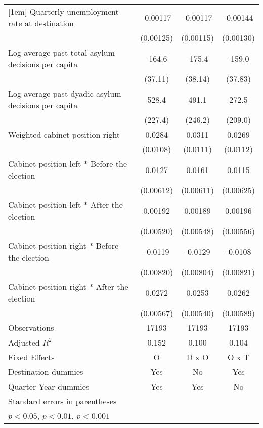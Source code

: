 \begin{table}[htbp]
\begin{tabular}{l*{3}{c}}
[1em]
Quarterly unemployment rate at destination&    -0.00117         &    -0.00117         &    -0.00144         \\
                    &   (0.00125)         &   (0.00115)         &   (0.00130)         \\
[1em]
Log average past total asylum decisions per capita&      -164.6\sym{***}&      -175.4\sym{***}&      -159.0\sym{***}\\
                    &     (37.11)         &     (38.14)         &     (37.83)         \\
[1em]
Log average past dyadic asylum decisions per capita&       528.4\sym{*}  &       491.1         &       272.5         \\
                    &     (227.4)         &     (246.2)         &     (209.0)         \\
[1em]
Weighted cabinet position right&      0.0284\sym{*}  &      0.0311\sym{**} &      0.0269\sym{*}  \\
                    &    (0.0108)         &    (0.0111)         &    (0.0112)         \\
[1em]
Cabinet position left * Before the election&      0.0127\sym{*}  &      0.0161\sym{*}  &      0.0115         \\
                    &   (0.00612)         &   (0.00611)         &   (0.00625)         \\
[1em]
Cabinet position left * After the election&     0.00192         &     0.00189         &     0.00196         \\
                    &   (0.00520)         &   (0.00548)         &   (0.00556)         \\
[1em]
Cabinet position right * Before the election&     -0.0119         &     -0.0129         &     -0.0108         \\
                    &   (0.00820)         &   (0.00804)         &   (0.00821)         \\
[1em]
Cabinet position right * After the election&      0.0272\sym{***}&      0.0253\sym{***}&      0.0262\sym{***}\\
                    &   (0.00567)         &   (0.00540)         &   (0.00589)         \\
\hline
Observations        &       17193         &       17193         &       17193         \\
Adjusted \(R^{2}\)  &       0.152         &       0.100         &       0.104         \\
Fixed Effects       &           O         &       D x O         &       O x T         \\
Destination dummies &         Yes         &          No         &         Yes         \\
Quarter-Year dummies&         Yes         &         Yes         &          No         \\
\hline\hline
\multicolumn{4}{l}{\footnotesize Standard errors in parentheses}\\
\multicolumn{4}{l}{\footnotesize \sym{*} \(p<0.05\), \sym{**} \(p<0.01\), \sym{***} \(p<0.001\)}\\
\end{tabular}
\end{table}
